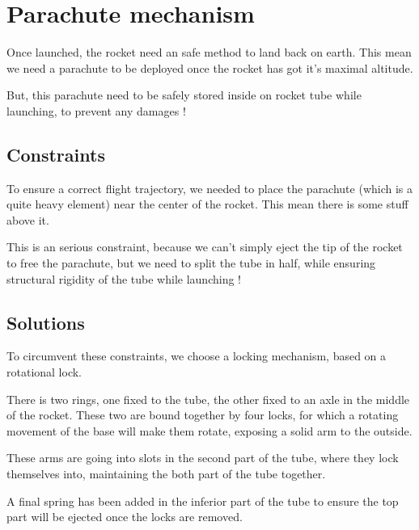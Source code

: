\section{Parachute mechanism}
Once launched, the rocket need an safe method to land back on earth. This mean
we need a parachute to be deployed once the rocket has got it's maximal
altitude.

But, this parachute need to be safely stored inside on rocket tube while
launching, to prevent any damages !

\subsection{Constraints}
To ensure a correct flight trajectory, we needed to place the parachute (which
is a quite heavy element) near the center of the rocket. This mean there is
some stuff above it.

This is an serious constraint, because we can't simply eject the tip of the
rocket to free the parachute, but we need to split the tube in half, while
ensuring structural rigidity of the tube while launching !

\subsection{Solutions}
To circumvent these constraints, we choose a locking mechanism, based on a
rotational lock.

There is two rings, one fixed to the tube, the other fixed to an axle in the
middle of the rocket. These two are bound together by four locks, for which a
rotating movement of the base will make them rotate, exposing a solid arm to
the outside.

These arms are going into slots in the second part of the tube, where they lock
themselves into, maintaining the both part of the tube together.

A final spring has been added in the inferior part of the tube to ensure the
top part will be ejected once the locks are removed.